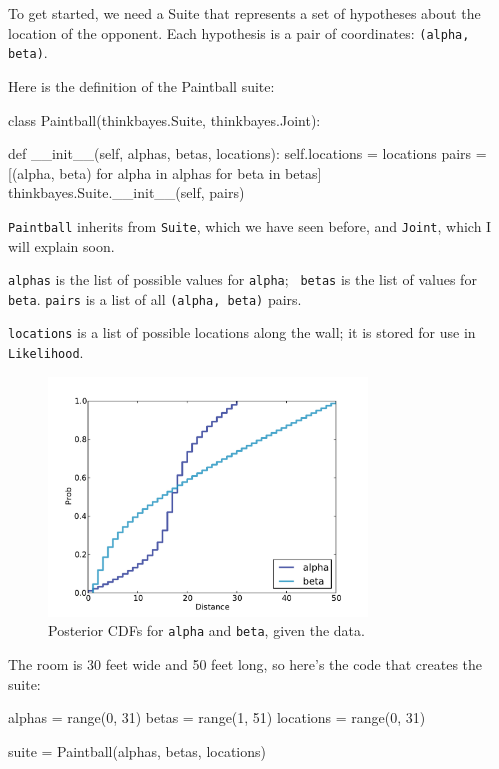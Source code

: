 \documentclass[12pt]{book}
\theoremstyle{exercise}
\begin{document}
To get started, we need a Suite that represents a set of hypotheses
about the location of the opponent.  Each hypothesis is a
pair of coordinates: {\tt (alpha, beta)}.

Here is the definition of the Paintball suite:

\begin{code}
class Paintball(thinkbayes.Suite, thinkbayes.Joint):

    def __init__(self, alphas, betas, locations):
        self.locations = locations
        pairs = [(alpha, beta) 
                 for alpha in alphas 
                 for beta in betas]
        thinkbayes.Suite.__init__(self, pairs)
\end{code}

{\tt Paintball} inherits from {\tt Suite}, which we have seen before,
and {\tt Joint}, which I will explain soon.

{\tt alphas} is the list of possible values for {\tt alpha}; {\tt
  betas} is the list of values for {\tt beta}.  {\tt pairs} is a list
of all {\tt (alpha, beta)} pairs.

{\tt locations} is a list of possible locations along
the wall; it is stored for use in {\tt Likelihood}.

\begin{figure}
\centerline{\includegraphics[height=2.5in]{figs/paintball2.pdf}}
\caption{Posterior CDFs for {\tt alpha} and {\tt beta}, given the data.}
\label{fig.paintball2}
\end{figure}

The room is 30 feet wide and 50 feet long, so here's the code that
creates the suite:

\begin{code}
    alphas = range(0, 31)
    betas = range(1, 51)
    locations = range(0, 31)

    suite = Paintball(alphas, betas, locations)
\end{code}
\end{document}
